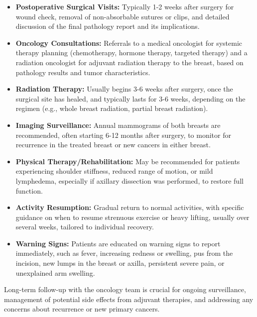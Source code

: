 \begin{itemize}
  \item \textbf{Postoperative Surgical Visits:} Typically 1-2 weeks after surgery for wound check, removal of non-absorbable sutures or clips, and detailed discussion of the final pathology report and its implications.
  
  \item \textbf{Oncology Consultations:} Referrals to a medical oncologist for systemic therapy planning (chemotherapy, hormone therapy, targeted therapy) and a radiation oncologist for adjuvant radiation therapy to the breast, based on pathology results and tumor characteristics.
  
  \item \textbf{Radiation Therapy:} Usually begins 3-6 weeks after surgery, once the surgical site has healed, and typically lasts for 3-6 weeks, depending on the regimen (e.g., whole breast radiation, partial breast radiation).
  
  \item \textbf{Imaging Surveillance:} Annual mammograms of both breasts are recommended, often starting 6-12 months after surgery, to monitor for recurrence in the treated breast or new cancers in either breast.
  
  \item \textbf{Physical Therapy/Rehabilitation:} May be recommended for patients experiencing shoulder stiffness, reduced range of motion, or mild lymphedema, especially if axillary dissection was performed, to restore full function.
  
  \item \textbf{Activity Resumption:} Gradual return to normal activities, with specific guidance on when to resume strenuous exercise or heavy lifting, usually over several weeks, tailored to individual recovery.
  
  \item \textbf{Warning Signs:} Patients are educated on warning signs to report immediately, such as fever, increasing redness or swelling, pus from the incision, new lumps in the breast or axilla, persistent severe pain, or unexplained arm swelling.
\end{itemize}

Long-term follow-up with the oncology team is crucial for ongoing surveillance, management of potential side effects from adjuvant therapies, and addressing any concerns about recurrence or new primary cancers.

